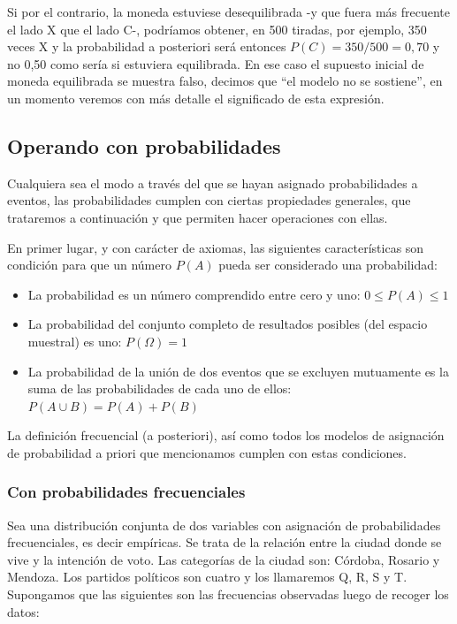 \documentclass[]{article}
\begin{document}
Si por el contrario, la moneda estuviese desequilibrada -y que fuera más
frecuente el lado X que el lado C-, podríamos obtener, en 500 tiradas,
por ejemplo, 350 veces X y la probabilidad a posteriori será entonces
\(P(C) = 350/500 = 0,70\) y no 0,50 como sería si estuviera equilibrada.
En ese caso el supuesto inicial de moneda equilibrada se muestra falso,
decimos que ``el modelo no se sostiene'', en un momento veremos con más
detalle el significado de esta expresión.

\hypertarget{operando-con-probabilidades}{%
\subsection{Operando con
probabilidades}\label{operando-con-probabilidades}}

Cualquiera sea el modo a través del que se hayan asignado probabilidades
a eventos, las probabilidades cumplen con ciertas propiedades generales,
que trataremos a continuación y que permiten hacer operaciones con
ellas.

En primer lugar, y con carácter de axiomas, las siguientes
características son condición para que un número \(P(A)\) pueda ser
considerado una probabilidad:

\begin{itemize}
\item
  La probabilidad es un número comprendido entre cero y uno:
  \(0 \leq P(A) \leq 1\)
\item
  La probabilidad del conjunto completo de resultados posibles (del
  espacio muestral) es uno: \(P(\Omega) = 1\)
\item
  La probabilidad de la unión de dos eventos que se excluyen mutuamente
  es la suma de las probabilidades de cada uno de ellos:
  \(P(A \cup B) = P(A) + P(B)\)
\end{itemize}

La definición frecuencial (a posteriori), así como todos los modelos de
asignación de probabilidad a priori que mencionamos cumplen con estas
condiciones.

\hypertarget{con-probabilidades-frecuenciales}{%
\subsubsection{Con probabilidades
frecuenciales}\label{con-probabilidades-frecuenciales}}

Sea una distribución conjunta de dos variables con asignación de
probabilidades frecuenciales, es decir empíricas. Se trata de la
relación entre la ciudad donde se vive y la intención de voto. Las
categorías de la ciudad son: Córdoba, Rosario y Mendoza. Los partidos
políticos son cuatro y los llamaremos Q, R, S y T. Supongamos que las
siguientes son las frecuencias observadas luego de recoger los datos:
\end{document}
